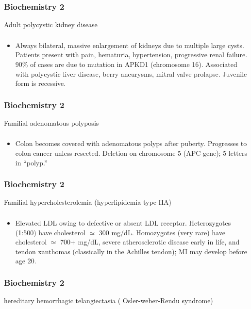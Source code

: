 \documentclass[11pt]{beamer}
\begin{document}
\begin{frame}
 \frametitle{Biochemistry 2}
Adult polycystic kidney disease
\end{frame}

\begin{frame}
 \frametitle{}
\begin{itemize}
\item Always bilateral, massive enlargement of kidneys due to multiple large cysts. Patients present with pain, hematuria, hypertension, progressive renal failure. 90\% of cases are due to mutation in APKD1 (chromosome 16). Associated with polycystic liver disease, berry aneurysms, mitral valve prolapse. Juvenile form is recessive.
\end{itemize}
\end{frame}

\begin{frame}
 \frametitle{Biochemistry 2}
Familial adenomatous polyposis
\end{frame}

\begin{frame}
 \frametitle{}
\begin{itemize}
\item Colon becomes covered with adenomatous polyps after puberty. Progresses to colon cancer unless resected. Deletion on chromosome 5 (APC gene); 5 letters in “polyp.”
\end{itemize}
\end{frame}

\begin{frame}
 \frametitle{Biochemistry 2}
Familial hypercholesterolemia (hyperlipidemia type IIA)
\end{frame}

\begin{frame}
 \frametitle{}
\begin{itemize}
\item Elevated LDL owing to defective or absent LDL receptor. Heterozygotes (1:500) have cholesterol ${\simeq}$ 300 mg/dL. Homozygotes (very rare) have cholesterol ${\simeq}$ 700+ mg/dL, severe atherosclerotic disease early in life, and tendon xanthomas (classically in the Achilles tendon); MI may develop before age 20.
\end{itemize}
\end{frame}

\begin{frame}
 \frametitle{Biochemistry 2}
hereditary hemorrhagic telangiectasia ( Osler-weber-Rendu syndrome) 
\end{frame}
\end{document}
